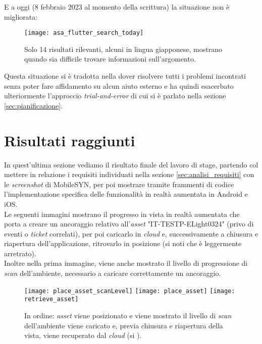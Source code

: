 E a oggi (8 febbraio 2023 al momento della scrittura) la situazione non è migliorata:

\begin{figure}[H]
  \centering
  \texttt{[image: asa\_flutter\_search\_today]}
  \caption[Ricerca esatta Flutter e ASA 8 febbraio]{Solo 14 risultati rilevanti, alcuni in lingua giapponese, mostrano quando sia difficile trovare informazioni sull'argomento.}
\end{figure}

Questa situazione si è tradotta nella dover risolvere tutti i problemi incontrati senza poter fare affidamento su alcun aiuto esterno e ha quindi esacerbato ulteriormente l'approccio \textit{trial-and-error} di cui si è parlato nella sezione \ref{sec:pianificazione}.


\section{Risultati raggiunti}
In quest'ultima sezione vediamo il risultato finale del lavoro di stage, partendo col mettere in relazione i requisiti individuati nella sezione \ref{sec:analisi_requisiti} con le \textit{screenshot} di MobileSYN, per poi mostrare tramite frammenti di codice l'implementazione specifica delle funzionalità in realtà aumentata in Android e iOS.\\
Le seguenti immagini mostrano il progresso in vista in realtà aumentata che porta a creare un ancoraggio relativo all'\textit{asset} "IT-TESTP-ELight0324" (privo di eventi o \textit{ticket} correlati), per poi caricarlo in \textit{cloud} e, successivamente a chiusura e riapertura dell'applicazione, ritrovarlo in posizione (si noti che è leggermente arretrato).\\
Inoltre nella prima immagine, viene anche mostrato il livello di progressione di \textit{scan} dell'ambiente, necessario a caricare correttamente un ancoraggio.

\begin{figure}[H]
  \centering
  \texttt{[image: place\_asset\_scanLevel]}\hfill
  \texttt{[image: place\_asset]}\hfill
  \texttt{[image: retrieve\_asset]}\hfill

  \caption[Creazione, caricamento e recupero di \textit{asset}]{In ordine: \textit{asset} viene posizionato e viene mostrato il livello di \textit{scan} dell'ambiente  viene caricato e, previa chiusura e riapertura della vista, viene recuperato dal \textit{cloud} (si ).}
  \label{fig:place_asset}
\end{figure}

